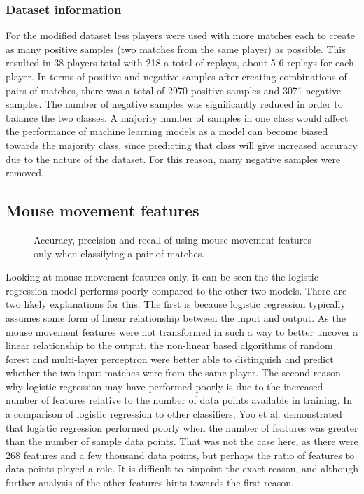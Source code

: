 \documentclass[Report.tex]{subfiles}
\newcommand{\baraxis}[8]{
\begin{axis}[
    ybar,
    title={#1},
    width=#5,
    height=#6,
    ymin=#3, ymax=#4,
    bar width=1em,
    legend style={at={#7},anchor=north,legend columns=-1},
    enlarge x limits=0.4,
    x tick label style={align=center,text width=#8},
    symbolic x coords={Logistic Regression, Random Forest, Multi-layer Perceptron},
    xtick=data,
    ylabel={#2}
]
}
\newcommand{\plotbar}[5]{
\addplot+[
	discard if not={numSplits}{#1},
	discard if not={split}{#2},
	discard if not={features}{#3},
] table [x=model, y=#4,col sep=comma] {data/19-pair-cv.csv};
\addlegendentry{#5}
}
\begin{document}
\subsubsection{Dataset information}
For the modified dataset less players were used with more matches each to create as many positive samples (two matches from the same player) as possible. This resulted in 38 players total with 218 a total of replays, about 5-6 replays for each player. In terms of positive and negative samples after creating combinations of pairs of matches, there was a total of 2970 positive samples and 3071 negative samples. The number of negative samples was significantly reduced in order to balance the two classes. A majority number of samples in one class would affect the performance of machine learning models as a model can become biased towards the majority class, since predicting that class will give increased accuracy due to the nature of the dataset. For this reason, many negative samples were removed.

\subsection{Mouse movement features}

\begin{figure}[H]
\centering
{}
\caption{Accuracy, precision and recall of using mouse movement features only when classifying a pair of matches.}
\end{figure}

Looking at mouse movement features only, it can be seen the the logistic regression model performs poorly compared to the other two models. There are two likely explanations for this. The first is because logistic regression typically assumes some form of linear relationship between the input and output. As the mouse movement features were not transformed in such a way to better uncover a linear relationship to the output, the non-linear based algorithms of random forest and multi-layer perceptron were better able to distinguish and predict whether the two input matches were from the same player. The second reason why logistic regression may have performed poorly is due to the increased number of features relative to the number of data points available in training. In a comparison of logistic regression to other classifiers, Yoo et al. \cite{lr-vs-rf} demonstrated that logistic regression performed poorly when the number of features was greater than the number of sample data points. That was not the case here, as there were 268 features and a few thousand data points, but perhaps the ratio of features to data points played a role. It is difficult to pinpoint the exact reason, and although further analysis of the other features hints towards the first reason.
\end{document}
